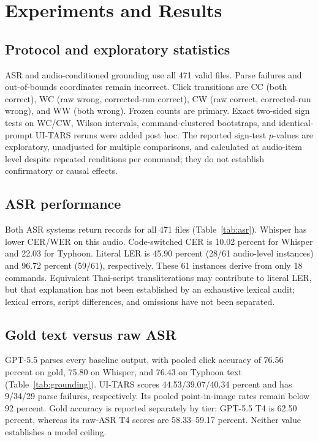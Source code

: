 \section{Experiments and Results}

\subsection{Protocol and exploratory statistics}

ASR and audio-conditioned grounding use all 471 valid files. Parse failures and out-of-bounds coordinates remain incorrect. Click transitions are CC (both correct), WC (raw wrong, corrected-run correct), CW (raw correct, corrected-run wrong), and WW (both wrong). Frozen counts are primary. Exact two-sided sign tests on WC/CW, Wilson intervals, command-clustered bootstraps, and identical-prompt UI-TARS reruns were added post hoc. The reported sign-test $p$-values are exploratory, unadjusted for multiple comparisons, and calculated at audio-item level despite repeated renditions per command; they do not establish confirmatory or causal effects.

\subsection{ASR performance}

Both ASR systems return records for all 471 files (Table~\ref{tab:asr}). Whisper has lower CER/WER on this audio. Code-switched CER is 10.02 percent for Whisper and 22.03 for Typhoon. Literal LER is 45.90 percent (28/61 audio-level instances) and 96.72 percent (59/61), respectively. These 61 instances derive from only 18 commands. Equivalent Thai-script transliterations may contribute to literal LER, but that explanation has not been established by an exhaustive lexical audit; lexical errors, script differences, and omissions have not been separated.



\subsection{Gold text versus raw ASR}

GPT-5.5 parses every baseline output, with pooled click accuracy of 76.56 percent on gold, 75.80 on Whisper, and 76.43 on Typhoon text (Table~\ref{tab:grounding}). UI-TARS scores 44.53/39.07/40.34 percent and has 9/34/29 parse failures, respectively. Its pooled point-in-image rates remain below 92 percent. Gold accuracy is reported separately by tier: GPT-5.5 T4 is 62.50 percent, whereas its raw-ASR T4 scores are 58.33--59.17 percent. Neither value establishes a model ceiling.

